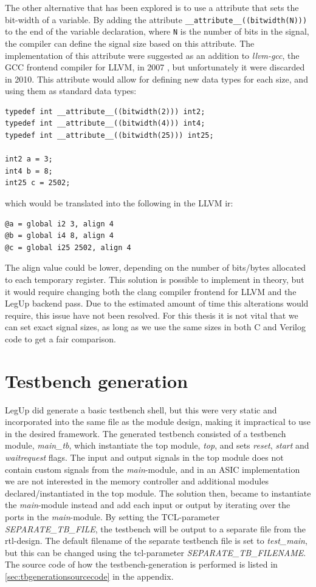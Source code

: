 The other alternative that has been explored is to use a attribute that sets the bit-width of a variable. By adding the attribute \verb!__attribute__((bitwidth(N)))! to the end of the variable declaration, where \verb!N! is the number of bits in the signal, the compiler can define the signal size based on this attribute. The implementation of this attribute were suggested as an addition to \textit{llvm-gcc}, the GCC frontend compiler for LLVM, in 2007 \cite{bitwidthattr}, but unfortunately it were discarded in 2010. This attribute would allow for defining new data types for each size, and using them as standard data types:
\begin{lstlisting}
typedef int __attribute__((bitwidth(2))) int2;
typedef int __attribute__((bitwidth(4))) int4;
typedef int __attribute__((bitwidth(25))) int25;

int2 a = 3;
int4 b = 8;
int25 c = 2502;
\end{lstlisting}
which would be translated into the following in the LLVM \gls{ir}:
\begin{lstlisting}
@a = global i2 3, align 4
@b = global i4 8, align 4
@c = global i25 2502, align 4
\end{lstlisting}
The align value could be lower, depending on the number of bits/bytes allocated to each temporary register. This solution is possible to implement in theory, but it would require changing both the clang compiler frontend for LLVM and the LegUp backend pass. Due to the estimated amount of time this alterations would require, this issue have not been resolved. For this thesis it is not vital that we can set exact signal sizes, as long as we use the same sizes in both C and Verilog code to get a fair comparison.

\section{\label{subsec:tbgen}Testbench generation}
LegUp did generate a basic testbench shell, but this were very static and incorporated into the same file as the module design, making it impractical to use in the desired framework. The generated testbench consisted of a testbench module, \textit{main\_tb}, which instantiate the top module, \textit{top}, and sets \textit{reset}, \textit{start} and \textit{waitrequest} flags. The input and output signals in the top module does not contain custom signals from the \textit{main}-module, and in an ASIC implementation we are not interested in the memory controller and additional modules declared/instantiated in the top module. The solution then, became to instantiate the \textit{main}-module instead and add each input or output by iterating over the ports in the \textit{main}-module. By setting the TCL-parameter \textit{SEPARATE\_TB\_FILE}, the testbench will be output to a separate file from the \gls{rtl}-design. The default filename of the separate testbench file is set to \textit{test\_main}, but this can be changed using the \gls{tcl}-parameter \textit{SEPARATE\_TB\_FILENAME}. The source code of how the testbench-generation is performed is listed in \cref{sec:tbgenerationsourcecode} in the appendix.

